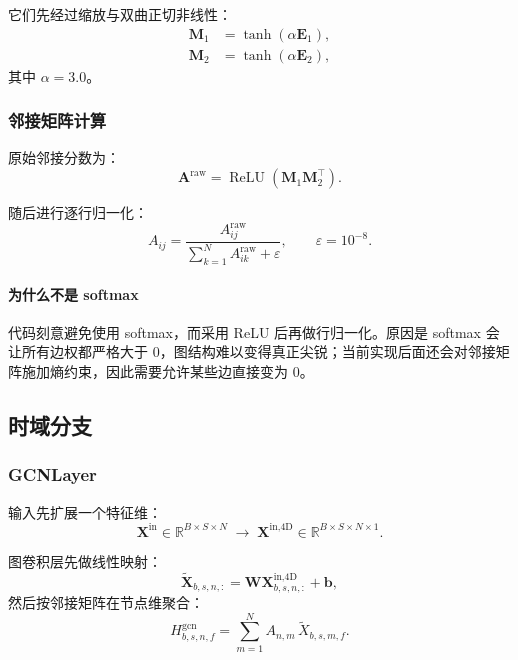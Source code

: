 \documentclass[UTF8]{ctexart}
\begin{document}
它们先经过缩放与双曲正切非线性：
\begin{align}
    \bm{M}_1 &= \tanh(\alpha \bm{E}_1), \\
    \bm{M}_2 &= \tanh(\alpha \bm{E}_2),
\end{align}
其中 $\alpha = 3.0$。

\subsubsection{邻接矩阵计算}

原始邻接分数为：
\begin{equation}
    \bm{A}^{\text{raw}} = \operatorname{ReLU}(\bm{M}_1 \bm{M}_2^\top).
\end{equation}

随后进行逐行归一化：
\begin{equation}
    A_{ij} = \frac{A^{\text{raw}}_{ij}}{\sum_{k=1}^{N}A^{\text{raw}}_{ik} + \varepsilon},
    \qquad \varepsilon = 10^{-8}.
\end{equation}

\paragraph{为什么不是 softmax}
代码刻意避免使用 softmax，而采用 ReLU 后再做行归一化。原因是 softmax 会让所有边权都严格大于 0，图结构难以变得真正尖锐；当前实现后面还会对邻接矩阵施加熵约束，因此需要允许某些边直接变为 0。

\subsection{时域分支}

\subsubsection{GCNLayer}

输入先扩展一个特征维：
\begin{equation}
    \bm{X}^{\text{in}} \in \mathbb{R}^{B \times S \times N}
    \;\longrightarrow\;
    \bm{X}^{\text{in,4D}} \in \mathbb{R}^{B \times S \times N \times 1}.
\end{equation}

图卷积层先做线性映射：
\begin{equation}
    \tilde{\bm{X}}_{b,s,n,:} = \bm{W}\bm{X}^{\text{in,4D}}_{b,s,n,:} + \bm{b},
\end{equation}
然后按邻接矩阵在节点维聚合：
\begin{equation}
    H^{\text{gcn}}_{b,s,n,f}
    =
    \sum_{m=1}^{N} A_{n,m}\,\tilde{X}_{b,s,m,f}.
\end{equation}
\end{document}

